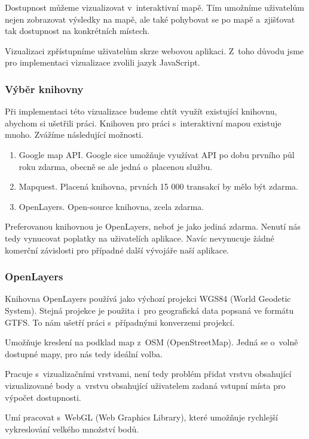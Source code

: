 Dostupnost můžeme vizualizovat v~interaktivní mapě. Tím umožníme uživatelům nejen zobrazovat výsledky na mapě, ale také pohybovat se po mapě a~zjišťovat tak dostupnost na konkrétních místech.

Vizualizaci zpřístupníme uživatelům skrze webovou aplikaci. Z~toho důvodu jsme pro implementaci vizualizace zvolili jazyk JavaScript.

\subsubsection{Výběr knihovny}

Při implementaci této vizualizace budeme chtít využít existující knihovnu, abychom si ušetřili práci. Knihoven pro práci s~interaktivní mapou existuje mnoho. Zvážíme následující možnosti.

\begin{enumerate}
    \item Google map API. Google sice umožňuje využívat API po dobu prvního půl roku zdarma, obecně se ale jedná o~placenou službu.
    \item Mapquest. Placená knihovna, prvních 15 000 transakcí by mělo být zdarma.
    \item OpenLayers. Open-source knihovna, zcela zdarma.
\end{enumerate}

Preferovanou knihovnou je OpenLayers, neboť je jako jediná zdarma. Nenutí nás tedy vynucovat poplatky na uživatelích aplikace. Navíc nevynucuje žádné komerční závislosti pro případné další vývojáře naší aplikace.

\subsubsection{OpenLayers}

Knihovna OpenLayers používá jako výchozí projekci WGS84 (World Geodetic System). Stejná projekce je použita i~pro geografická data popsaná ve formátu GTFS. To nám ušetří práci s~případnými konverzemi projekcí.

Umožňuje kreslení na podklad map z~OSM (OpenStreetMap). Jedná se o~volně dostupné mapy, pro nás tedy ideální volba.

Pracuje s~vizualizačními vrstvami, není tedy problém přidat vrstvu obsahující vizualizované body a~vrstvu obsahující uživatelem zadaná vstupní místa pro výpočet dostupnosti.

Umí pracovat s~WebGL (Web Graphics Library), které umožňuje rychlejší vykreslování velkého množství bodů.

